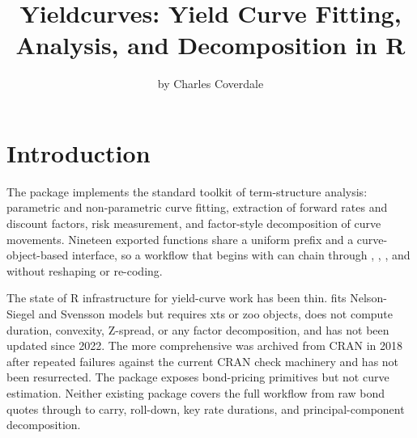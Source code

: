 \title{Yieldcurves: Yield Curve Fitting, Analysis, and Decomposition in R}


\author{by Charles Coverdale}

\maketitle


\section{Introduction}\label{introduction}

The  package implements the standard toolkit
of term-structure analysis: parametric and non-parametric curve
fitting, extraction of forward rates and discount factors, risk
measurement, and factor-style decomposition of curve movements.
Nineteen exported functions share a uniform  prefix and
a curve-object-based interface, so a workflow that begins with
 can chain through ,
, , and 
without reshaping or re-coding.

The state of R infrastructure for yield-curve work has been thin.
 \citep{guirreri2022yieldcurve} fits Nelson-Siegel
and Svensson models but requires xts or zoo objects, does not
compute duration, convexity, Z-spread, or any factor decomposition,
and has not been updated since 2022. The more comprehensive
 was archived from CRAN in 2018 after repeated
failures against the current CRAN check machinery and has not been
resurrected. The  package exposes bond-pricing
primitives but not curve estimation. Neither existing package
covers the full workflow from raw bond quotes through to carry,
roll-down, key rate durations, and principal-component
decomposition.

